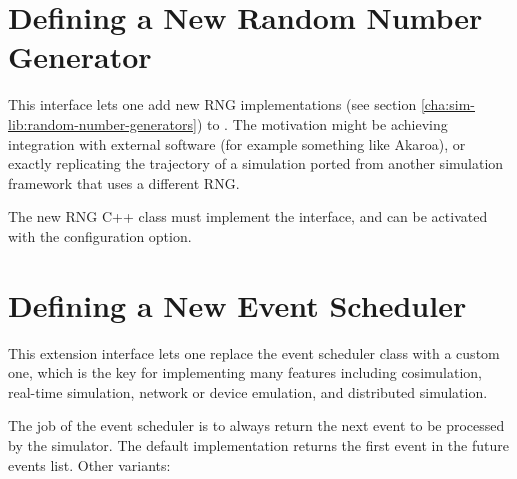 \section{Defining a New Random Number Generator}
\label{sec:plugin-exts:rng}

This interface lets one add new RNG implementations (see section
\ref{cha:sim-lib:random-number-generators}) to {\opp}.
The motivation might be achieving integration with external software (for
example something like Akaroa), or exactly replicating the trajectory of a
simulation ported from another simulation framework that uses a different
RNG.

The new RNG C++ class must implement the  interface,
and can be activated with the  configuration option.


\section{Defining a New Event Scheduler}
\label{sec:plugin-exts:scheduler}

This extension interface lets one replace the event scheduler class with a
custom one, which is the key for implementing many features including
cosimulation, real-time simulation, network or device emulation, and
distributed simulation.

The job of the event scheduler is to always return the next event to be
processed by the simulator. The default implementation returns the first
event in the future events list. Other variants:

